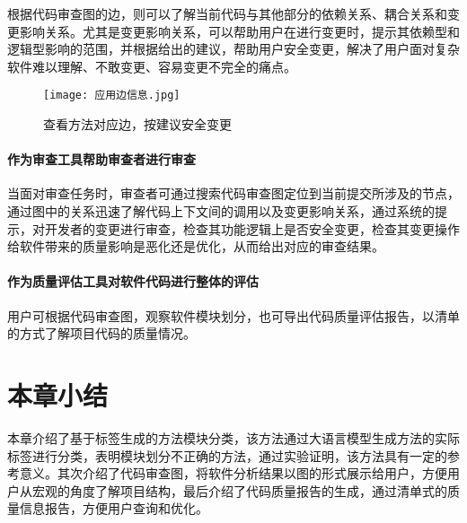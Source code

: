 根据代码审查图的边，则可以了解当前代码与其他部分的依赖关系、耦合关系和变更影响关系。尤其是变更影响关系，可以帮助用户在进行变更时，提示其依赖型和逻辑型影响的范围，并根据给出的建议，帮助用户安全变更，解决了用户面对复杂软件难以理解、不敢变更、容易变更不完全的痛点。

\begin{figure}[h]
\centering
\texttt{[image: 应用边信息.jpg]}
\caption{查看方法对应边，按建议安全变更}
\end{figure}

\paragraph{作为审查工具帮助审查者进行审查} 当面对审查任务时，审查者可通过搜索代码审查图定位到当前提交所涉及的节点，通过图中的关系迅速了解代码上下文间的调用以及变更影响关系，通过系统的提示，对开发者的变更进行审查，检查其功能逻辑上是否安全变更，检查其变更操作给软件带来的质量影响是恶化还是优化，从而给出对应的审查结果。

\paragraph{作为质量评估工具对软件代码进行整体的评估} 用户可根据代码审查图，观察软件模块划分，也可导出代码质量评估报告，以清单的方式了解项目代码的质量情况。



\section{本章小结}

本章介绍了基于标签生成的方法模块分类，该方法通过大语言模型生成方法的实际标签进行分类，表明模块划分不正确的方法，通过实验证明，该方法具有一定的参考意义。其次介绍了代码审查图，将软件分析结果以图的形式展示给用户，方便用户从宏观的角度了解项目结构，最后介绍了代码质量报告的生成，通过清单式的质量信息报告，方便用户查询和优化。





